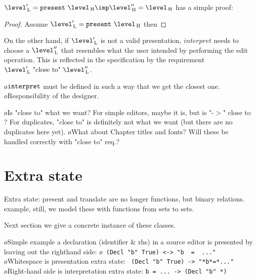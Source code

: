 
$\level'\L = \present~\level\H \imp \level''\H = \level\H$ has a simple proof:


\begin{proof} Assume $\level'\L = \present~\level\H$ then
\end{proof}



On the other hand, if $\level'\L$ is not a valid presentation, $interpret$ needs to choose a  $\level''\L$ that resembles what the user intended by performing the edit operation. This is reflected in the specification by the requirement $\level'\L~\text{"close to"}~\level''\L$.

\bl
\o ${\tt interpret}$ must be defined in such a way that we get the closest one.
\o Responsibility of the designer.
\el

\bl
\o Is "close to" what we want? For simple editors, maybe it is, but is "-$>$" close to \rarr? For duplicates, "close to" is definitely not what we want (but there are no duplicates here yet).
\o What about Chapter titles and fonts? Will these be handled correctly with "close to" req.?
\el





%																
%																
%																
\section{Extra state}


Extra state: present and translate are no longer functions, but binary relations. example, still, we model these with functions from sets to sets.

Next section we give a concrete instance of these classes.

\bl
\o Simple example a declaration (identifier \& rhs) in a source editor is presented by leaving out the righthand side:
\o  \verb| (Decl "b" True) <-> "b  =  ..."|
\o Whitespace is presentation extra state: \verb| (Decl "b" True) -> "*b*=*..."|
\o Right-hand side is interpretation extra state: \verb|b = ... -> (Decl "b" *)|
\el

